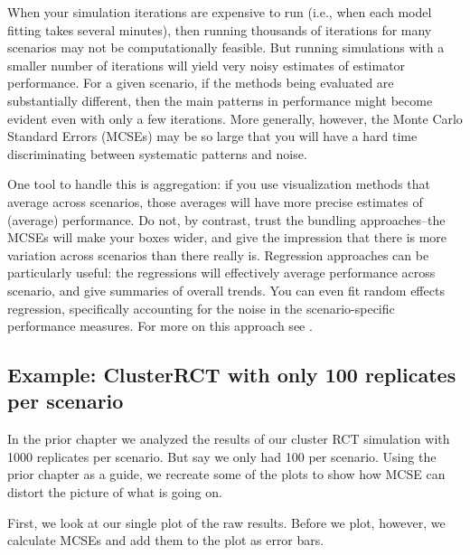 \documentclass[
]{book}
\begin{document}
When your simulation iterations are expensive to run (i.e., when each model fitting takes several minutes), then running thousands of iterations for many scenarios may not be computationally feasible.
But running simulations with a smaller number of iterations will yield very noisy estimates of estimator performance.
For a given scenario, if the methods being evaluated are substantially different, then the main patterns in performance might become evident even with only a few iterations. More generally, however, the Monte Carlo Standard Errors (MCSEs) may be so large that you will have a hard time discriminating between systematic patterns and noise.

One tool to handle this is aggregation: if you use visualization methods that average across scenarios, those averages will have more precise estimates of (average) performance.
Do not, by contrast, trust the bundling approaches--the MCSEs will make your boxes wider, and give the impression that there is more variation across scenarios than there really is.
Regression approaches can be particularly useful: the regressions will effectively average performance across scenario, and give summaries of overall trends.
You can even fit random effects regression, specifically accounting for the noise in the scenario-specific performance measures.
For more on this approach see \citet{gilbert2024multilevel}.

\subsection{Example: ClusterRCT with only 100 replicates per scenario}\label{example-clusterrct-with-only-100-replicates-per-scenario}

In the prior chapter we analyzed the results of our cluster RCT simulation with 1000 replicates per scenario.
But say we only had 100 per scenario.
Using the prior chapter as a guide, we recreate some of the plots to show how MCSE can distort the picture of what is going on.

First, we look at our single plot of the raw results.
Before we plot, however, we calculate MCSEs and add them to the plot as error bars.
\end{document}
